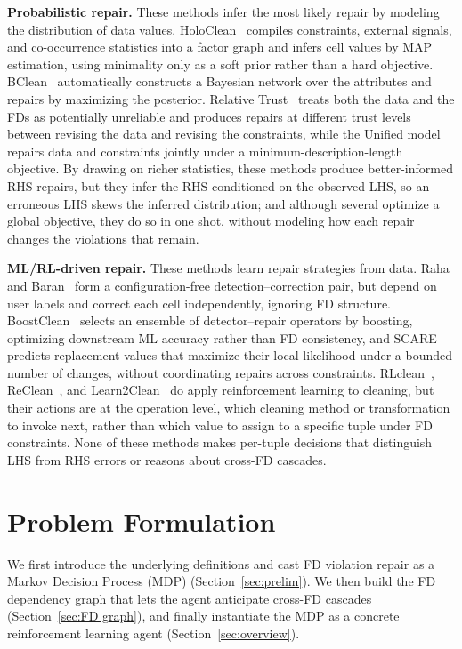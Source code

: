 \documentclass[sigconf]{acmart}
\begin{document}
\noindent\textbf{Probabilistic repair.}
These methods infer the most likely repair by modeling the distribution of data values. HoloClean~\cite{b1} compiles constraints, external signals, and co-occurrence statistics into a factor graph and infers cell values by MAP estimation, using minimality only as a soft prior rather than a hard objective. BClean~\cite{b9} automatically constructs a Bayesian network over the attributes and repairs by maximizing the posterior. Relative Trust~\cite{b36} treats both the data and the FDs as potentially unreliable and produces repairs at different trust levels between revising the data and revising the constraints, while the Unified model~\cite{b37} repairs data and constraints jointly under a minimum-description-length objective. By drawing on richer statistics, these methods produce better-informed RHS repairs, but they infer the RHS conditioned on the observed LHS, so an erroneous LHS skews the inferred distribution; and although several optimize a global objective, they do so in one shot, without modeling how each repair changes the violations that remain.

\noindent\textbf{ML/RL-driven repair.}
These methods learn repair strategies from data. Raha and Baran~\cite{b23} form a configuration-free detection--correction pair, but depend on user labels and correct each cell independently, ignoring FD structure. BoostClean~\cite{b38} selects an ensemble of detector--repair operators by boosting, optimizing downstream ML accuracy rather than FD consistency, and SCARE~\cite{b39} predicts replacement values that maximize their local likelihood under a bounded number of changes, without coordinating repairs across constraints. RLclean~\cite{b10}, ReClean~\cite{b11}, and Learn2Clean~\cite{b32} do apply reinforcement learning to cleaning, but their actions are at the operation level, which cleaning method or transformation to invoke next, rather than which value to assign to a specific tuple under FD constraints. None of these methods makes per-tuple decisions that distinguish LHS from RHS errors or reasons about cross-FD cascades.

\section{Problem Formulation}
\label{sec:problem}
We first introduce the underlying definitions and cast FD violation repair as a Markov Decision Process (MDP) (Section~\ref{sec:prelim}). We then build the FD dependency graph that lets the agent anticipate cross-FD cascades (Section~\ref{sec:FD graph}), and finally instantiate the MDP as a concrete reinforcement learning agent (Section~\ref{sec:overview}).
\end{document}
